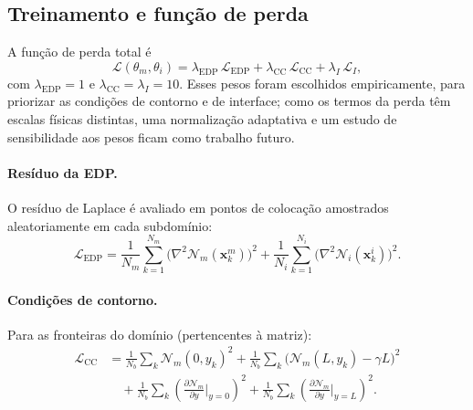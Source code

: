 \documentclass[brazil]{TCAM} %
\begin{document}
\subsection{Treinamento e função de perda}

A função de perda total é
\begin{equation}
    \mathcal{L}(\theta_m, \theta_i)
    = \lambda_{\text{EDP}}\,\mathcal{L}_{\text{EDP}}
    + \lambda_{\text{CC}}\,\mathcal{L}_{\text{CC}}
    + \lambda_{I}\,\mathcal{L}_{I},
\end{equation}
com $\lambda_{\text{EDP}} = 1$ e $\lambda_{\text{CC}} = \lambda_I = 10$. Esses pesos
foram escolhidos empiricamente, para priorizar as condições de contorno e de
interface; como os termos da perda têm escalas físicas distintas, uma normalização
adaptativa e um estudo de sensibilidade aos pesos ficam como trabalho futuro.

\paragraph{Resíduo da EDP.}
O resíduo de Laplace é avaliado em pontos de colocação amostrados
aleatoriamente em cada subdomínio:
\begin{equation}
    \mathcal{L}_{\text{EDP}}
    = \frac{1}{N_m}\sum_{k=1}^{N_m}
      \bigl(\nabla^2 \mathcal{N}_m(\mathbf{x}_k^m)\bigr)^2
    + \frac{1}{N_i}\sum_{k=1}^{N_i}
      \bigl(\nabla^2 \mathcal{N}_i(\mathbf{x}_k^i)\bigr)^2.
\end{equation}

\paragraph{Condições de contorno.}
Para as fronteiras do domínio (pertencentes à matriz):
\begin{equation}
\begin{aligned}
    \mathcal{L}_{\text{CC}}
    &= \frac{1}{N_b}\sum_k \mathcal{N}_m(0,y_k)^2
    + \frac{1}{N_b}\sum_k \bigl(\mathcal{N}_m(L,y_k)-\gamma L\bigr)^2 \\
    &\quad
    + \frac{1}{N_b}\sum_k \left(\frac{\partial \mathcal{N}_m}{\partial y}
      \bigg|_{y=0}\right)^2
    + \frac{1}{N_b}\sum_k \left(\frac{\partial \mathcal{N}_m}{\partial y}
      \bigg|_{y=L}\right)^2.
\end{aligned}
\end{equation}
\end{document}
